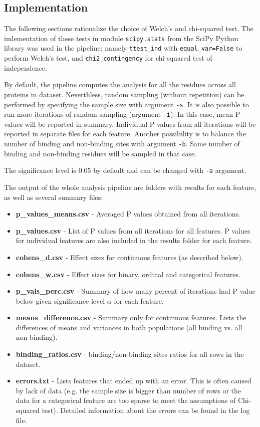 \subsection{Implementation}

The following sections rationalize the choice of Welch's and chi-squared test. The imlementation of these tests in module \texttt{scipy.stats} from the SciPy Python library \cite{scipy} was used in the pipeline; namely \texttt{ttest\_ind} with \texttt{equal\_var=False} to perform Welch's test, and \texttt{chi2\_contingency} for chi-squared test of independence.

By default, the pipeline computes the analysis for all the residues across all proteins in dataset. Neverthless, random sampling (without repetition) can be performed by specifying the sample size with argument \texttt{-s}. It is also possible to run more iterations of random sampling (argument \texttt{-i}). In this case, mean P values will be reported in summary. Individual P values from all iterations will be reported in separate files for each feature. Another possibility is to balance the number of binding and non-binding sites with argument \texttt{-b}. Same number of binding and non-binding residues will be sampled in that case.

The significance level is 0.05 by default and can be changed with \texttt{-a} argument.

The output of the whole analysis pipeline are folders with results for each feature, as well as several summary files:

\begin{itemize}
\item \textbf{p\_values\_means.csv} - Averaged P values obtained from all iterations.
\item \textbf{p\_values.csv} - List of P values from all iterations for all features. P values for individual features are also included in the results folder for each feature.
\item \textbf{cohens\_d.csv} - Effect sizes for continuous features (as described below).
\item \textbf{cohens\_w.csv} - Effect sizes for binary, ordinal and categorical features.
\item \textbf{p\_vals\_perc.csv} - Summary of how many percent of iterations had P value below given significance level $\alpha$ for each feature.
\item \textbf{means\_difference.csv} - Summary only for continuous features. Lists the differences of means and variances in both populations (all binding vs. all non-binding).
\item \textbf{binding\_ratios.csv} - binding/non-binding sites ratios for all rows in the dataset.
\item \textbf{errors.txt} - Lists features that ended up with an error. This is often caused by lack of data (e.g. the sample size is bigger than number of rows or the data for a categorical feature are too sparse to meet the assumptions of Chi-squared test). Detailed information about the errors can be found in the log file.
\end{itemize}

